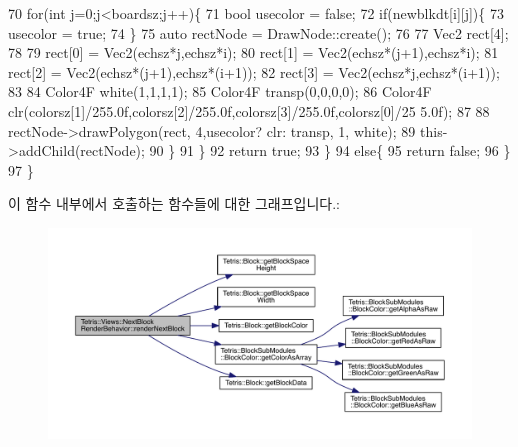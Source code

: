 \begin{DoxyCode}
70                         \textcolor{keywordflow}{for}(\textcolor{keywordtype}{int} j=0;j<boardsz;j++)\{
71                             \textcolor{keywordtype}{bool} usecolor = \textcolor{keyword}{false};
72                             \textcolor{keywordflow}{if}(newblkdt[i][j])\{
73                                 usecolor = \textcolor{keyword}{true};
74                             \}
75                             \textcolor{keyword}{auto} rectNode = DrawNode::create();
76                             
77                             Vec2 rect[4];
78 
79                             rect[0] = Vec2(echsz*j,echsz*i);
80                             rect[1] = Vec2(echsz*(j+1),echsz*i);
81                             rect[2] = Vec2(echsz*(j+1),echsz*(i+1));
82                             rect[3] = Vec2(echsz*j,echsz*(i+1));
83                             
84                             Color4F white(1,1,1,1);
85                             Color4F transp(0,0,0,0);
86                             Color4F clr(colorsz[1]/255.0f,colorsz[2]/255.0f,colorsz[3]/255.0f,colorsz[0]/25
      5.0f);
87                             
88                             rectNode->drawPolygon(rect, 4,usecolor? clr: transp, 1, white);
89                             this->addChild(rectNode);
90                         \}
91                     \}
92                     \textcolor{keywordflow}{return} \textcolor{keyword}{true};
93                 \}
94                 \textcolor{keywordflow}{else}\{
95                     \textcolor{keywordflow}{return} \textcolor{keyword}{false};
96                 \}
97             \}
\end{DoxyCode}
이 함수 내부에서 호출하는 함수들에 대한 그래프입니다.\+:
\nopagebreak
\begin{figure}[H]
\begin{center}
\leavevmode
\includegraphics[width=350pt]{d5/da8/class_tetris_1_1_views_1_1_next_block_render_behavior_aa9240528e0603ca129d7877f9e71b27d_cgraph}
\end{center}
\end{figure}
\mbox{\label{class_tetris_1_1_views_1_1_next_block_render_behavior_a35709270c896ca2a21266b52727412ae}} 
